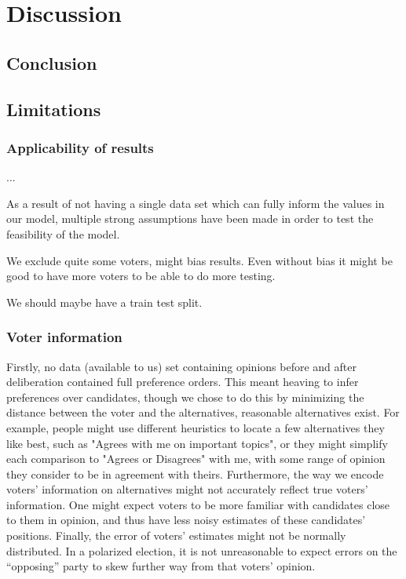\newpage
\chapter{Discussion}
\label{Discussion}


\section{Conclusion}



\section{Limitations}

\subsection{Applicability of results}
...


As a result of not having a single data set which can fully inform the values
in our model, multiple strong assumptions have been made in order to test the
feasibility of the model.


We exclude quite some voters, might bias results. Even without bias it might be good to have more voters to be able to do more testing.

We should maybe have a train test split.

\subsection{Voter information}

Firstly, no data (available to us) set containing opinions before and after
deliberation contained full preference orders. This meant heaving to infer
preferences over candidates, though we chose to do this by minimizing the
distance between the voter and the alternatives, reasonable alternatives exist.
For example, people might use different heuristics to locate a few alternatives
they like best, such as "Agrees with me on important topics", or they might
simplify each comparison to "Agrees or Disagrees" with me, with some range of
opinion they consider to be in agreement with theirs. Furthermore, the way we
encode voters' information on alternatives might not accurately reflect true
voters' information. One might expect voters to be more familiar with
candidates close to them in opinion, and thus have less noisy estimates of
these candidates' positions. Finally,  the error of voters' estimates might not
be normally distributed. In a polarized election, it is not unreasonable to
expect errors on the ``opposing'' party to skew further way from that voters'
opinion.



